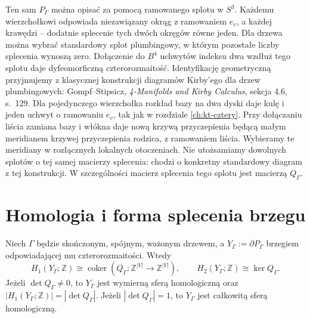 \begin{center}
\end{center}

\begin{uwaga}
Ten sam $P_\Gamma$ można opisać za pomocą ramowanego splotu
w $S^3$. Każdemu wierzchołkowi odpowiada niezawiązany okrąg
z ramowaniem $e_v$, a każdej krawędzi -- dodatnie splecenie
tych dwóch okręgów równe jeden. Dla drzewa można wybrać
standardowy splot plumbingowy, w którym pozostałe liczby
splecenia wynoszą zero. Dołączenie do $B^4$ uchwytów indeksu
dwa wzdłuż tego splotu daje dyfeomorficzną czterorozmaitość.
Identyfikację geometryczną przyjmujemy z klasycznej
konstrukcji diagramów Kirby'ego dla drzew plumbingowych:
Gompf--Stipsicz, \emph{4-Manifolds and Kirby Calculus},
sekcja 4.6, s.~129. Dla pojedynczego wierzchołka
rozkład bazy na dwa dyski daje kulę i jeden
uchwyt o ramowaniu $e_v$, tak jak w rozdziale
\ref{ch:kt-cztery}. Przy dołączaniu liścia
zamiana bazy i włókna daje nową krzywą
przyczepienia będącą małym meridianem
krzywej przyczepienia rodzica, z ramowaniem
liścia. Wybieramy te meridiany w rozłącznych
lokalnych otoczeniach. Nie utożsamiamy
dowolnych splotów o tej samej macierzy
splecenia: chodzi o konkretny standardowy
diagram z tej konstrukcji.
W szczególności macierz splecenia tego splotu jest macierzą
$Q_\Gamma$.
\end{uwaga}

\section{Homologia i forma splecenia brzegu}
\label{sec:tg-plumbing-boundary}

\begin{twierdzenie}
\label{thm:tg-plumbing-boundary}
Niech $\Gamma$ będzie skończonym, spójnym, ważonym drzewem,
a $Y_\Gamma:=\partial P_\Gamma$ brzegiem odpowiadającej
mu czterorozmaitości. Wtedy
\[
H_1(Y_\Gamma;\mathbb Z)\cong
\operatorname{coker}(Q_\Gamma:\mathbb Z^{|V|}\to\mathbb Z^{|V|}),
\qquad
H_2(Y_\Gamma;\mathbb Z)\cong\ker Q_\Gamma.
\]
Jeżeli $\det Q_\Gamma\ne0$, to $Y_\Gamma$ jest wymierną
sferą homologiczną oraz
$|H_1(Y_\Gamma;\mathbb Z)|=|\det Q_\Gamma|$.
Jeżeli $|\det Q_\Gamma|=1$, to $Y_\Gamma$ jest całkowitą
sferą homologiczną.
\end{twierdzenie}

